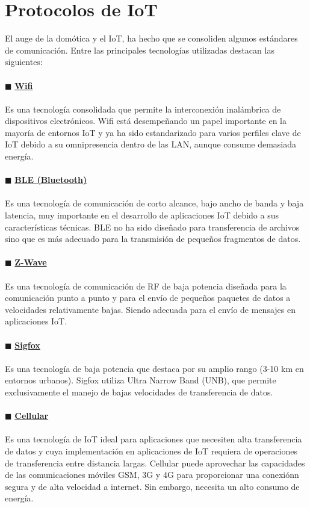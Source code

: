 \section{Protocolos de IoT} %
El auge de la domótica y el IoT, ha hecho que se consoliden algunos estándares de comunicación. Entre las principales tecnologías utilizadas destacan las siguientes:
\\\\$\blacksquare$ {\underline{\textbf{Wifi}}} %
\\\\Es una tecnología consolidada que permite la interconexión inalámbrica de dispositivos electrónicos. Wifi está desempeñando un papel importante en la mayoría de entornos IoT y ya ha sido estandarizado para varios perfiles clave de IoT debido a su omnipresencia dentro de las LAN, aunque consume demasiada energía.
\\\\$\blacksquare$ {\underline{\textbf{BLE (Bluetooth)}}} %
\\\\Es una tecnología de comunicación de corto alcance, bajo ancho de banda y baja latencia, muy importante en el desarrollo de aplicaciones IoT debido a sus características técnicas. BLE no ha sido diseñado para transferencia de archivos sino que es más adecuado para la transmisión de pequeños fragmentos de datos. 
\\\\$\blacksquare$ {\underline{\textbf{Z-Wave}}} %
\\\\Es una tecnología de comunicación de RF de baja potencia diseñada para la comunicación punto a punto y para el envío de pequeños paquetes de datos a velocidades relativamente bajas. Siendo adecuada para el envío de mensajes en aplicaciones IoT.
\\\\$\blacksquare$ {\underline{\textbf{Sigfox}}} %
\\\\Es una tecnología de baja potencia que destaca por su amplio rango (3-10 km en entornos urbanos). Sigfox utiliza Ultra Narrow Band (UNB), que permite exclusivamente el manejo de bajas velocidades de transferencia de datos.
\\\\$\blacksquare$ {\underline{\textbf{Cellular}}} %
\\\\Es una tecnología de IoT ideal para aplicaciones que necesiten alta transferencia de datos y cuya implementación en aplicaciones de IoT requiera de operaciones de transferencia entre distancia largas. Cellular puede aprovechar las capacidades de las comunicaciones móviles GSM, 3G y 4G para proporcionar una conexiónn segura y de alta velocidad a internet. Sin embargo, necesita un alto consumo de energía.
